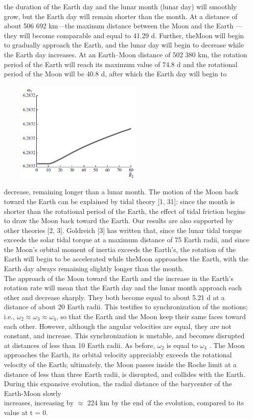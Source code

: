 \documentclass[fontsize = 11pt,a4paper]{article}
\begin{document}
\begin{multicols}{2}
the duration of the Earth day and the lunar month
(lunar day) will smoothly grow, but the Earth day
will remain shorter than the month. At a distance of
about 506 692 km—the maxinum distance between
the Moon and the Earth —they will become comparable
and equal to 41.29 d. Further, theMoon will begin
to gradually approach the Earth, and the lunar day
will begin to decrease while the Earth day increases.
At an Earth–Moon distance of 502 380 km, the rotation
period of the Earth will reach its maximum value
of 74.8 d and the rotational period of the Moon will
be 40.8 d, after which the Earth day will begin to
\begin{flushright}
\includegraphics[width=8cm,height=5cm]{graph18.png}
\end{flushright}
decrease, remaining longer than a lunar month. The
motion of the Moon back toward the Earth can be
explained by tidal theory [1, 31]: since the month is
shorter than the rotational period of the Earth, the
effect of tidal friction begins to draw the Moon back
toward the Earth. Our results are also supported by
other theories [2, 3]. Goldreich [3] has written that,
since the lunar tidal torque exceeds the solar tidal
torque at a maximum distance of 75 Earth radii, and
since the Moon’s orbital moment of inertia exceeds
the Earth’s, the rotation of the Earth will begin to
be accelerated while theMoon approaches the Earth,
with the Earth day always remaining slightly longer
than the month. \\ 
\indent
The approach of the Moon toward the Earth and
the increase in the Earth’s rotation rate will mean
that the Earth day and the lunar month approach
each other and decrease sharply. They both become
equal to about 5.21 d at a distance of about 20 Earth
radii. This testifies to synchronization of the motions;
i.e., $\omega_2 \approx \omega_3 \approx \omega_4$, so that the Earth and the Moon
keep their same faces toward each other. However,
although the angular velocities are equal, they are
not constant, and increase. This synchronization is
unstable, and becomes disrupted at distances of less
than 10 Earth radii. As before, $\omega_2$ is equal to $\omega_4$ . The
Moon approaches the Earth, its orbital velocity appreciably
exceeds the rotational velocity of the Earth;
ultimately, the Moon passes inside the Roche limit at
a distance of less than three Earth radii, is disrupted,
and collides with the Earth. \\
\indent During this expansive evolution, the radial distance
of the barycenter of the Earth-Moon slowly\\
increases, increasing by $\approx $ 224 km by the end of the
evolution, compared to its value at t = 0.
\end{multicols}
\end{document}
